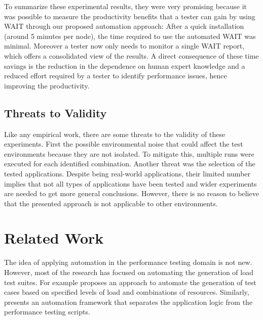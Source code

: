 \documentclass[runningheads,a4paper]{llncs}
\begin{document}
To summarize these experimental results, they were very promising because it
was possible to measure the productivity benefits that a tester can gain by using
WAIT through our proposed automation approach: After a quick installation
(around 5 minutes per node), the time required to use the automated WAIT was
minimal. Moreover a tester now only needs to monitor a single WAIT report, which
offers a consolidated view of the results. A direct consequence of these
time savings is the reduction in the dependence on human expert knowledge and
a reduced effort required by a tester to identify performance issues, hence
improving the productivity.

\vspace{-7pt}
\subsection{Threats to Validity}
\vspace{-7pt}
Like any empirical work, there are some threats to the validity of these
experiments. First the possible environmental noise that could affect the test
environments because they are not isolated. To mitigate this, multiple runs were
executed for each identified combination. Another threat was the selection of
the tested applications. Despite being real-world applications, their limited
number implies that not all types of applications have been tested and wider
experiments are needed to get more general conclusions. However, there is no
reason to believe that the presented approach is not applicable to other
environments.

\vspace{-7pt}
\section{Related Work}
\label{RelatedWork}
\vspace{-7pt}

The idea of applying automation in the performance testing domain is not new.
However, most of the research has focused on automating the generation of load
test
suites\cite{Elvira1,Bayan1,Zhang1,Briand1,Avritzer2,Avritzer3,Chen1,Garousi1}.
For example \cite{Bayan1} proposes an approach to automate the generation of test 
cases based on specified levels of load and combinations of resources.
Similarly, \cite{Chen1} presents an automation framework that separates the
application logic from the performance testing scripts.
\end{document}
